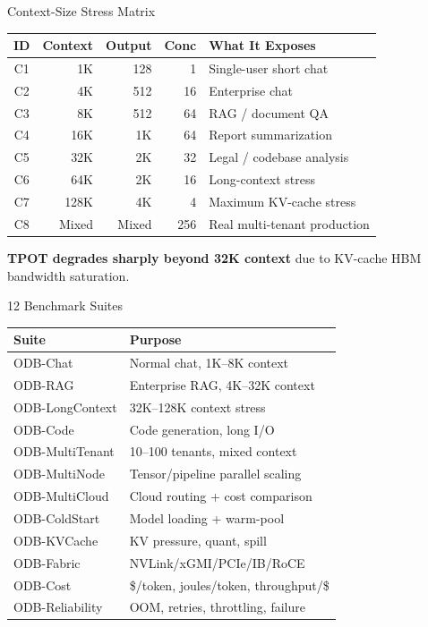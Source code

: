 \documentclass[aspectratio=169,10pt]{beamer}
\begin{document}
\begin{frame}{Context-Size Stress Matrix}
\centering
\small
\begin{tabular}{@{}crrrl@{}}
\toprule
\textbf{ID} & \textbf{Context} & \textbf{Output} & \textbf{Conc} & \textbf{What It Exposes} \\
\midrule
C1 & 1K & 128 & 1 & Single-user short chat \\
C2 & 4K & 512 & 16 & Enterprise chat \\
C3 & 8K & 512 & 64 & RAG / document QA \\
C4 & 16K & 1K & 64 & Report summarization \\
C5 & 32K & 2K & 32 & Legal / codebase analysis \\
C6 & 64K & 2K & 16 & Long-context stress \\
C7 & 128K & 4K & 4 & Maximum KV-cache stress \\
C8 & Mixed & Mixed & 256 & Real multi-tenant production \\
\bottomrule
\end{tabular}
\vspace{0.5em}

\textcolor{t4}{\textbf{TPOT degrades sharply beyond 32K context}} due to KV-cache HBM bandwidth saturation.
\end{frame}

\begin{frame}{12 Benchmark Suites}
\centering
\small
\begin{tabular}{@{}ll@{}}
\toprule
\textbf{Suite} & \textbf{Purpose} \\
\midrule
ODB-Chat & Normal chat, 1K--8K context \\
ODB-RAG & Enterprise RAG, 4K--32K context \\
ODB-LongContext & 32K--128K context stress \\
ODB-Code & Code generation, long I/O \\
ODB-MultiTenant & 10--100 tenants, mixed context \\
ODB-MultiNode & Tensor/pipeline parallel scaling \\
ODB-MultiCloud & Cloud routing + cost comparison \\
ODB-ColdStart & Model loading + warm-pool \\
ODB-KVCache & KV pressure, quant, spill \\
ODB-Fabric & NVLink/xGMI/PCIe/IB/RoCE \\
ODB-Cost & \$/token, joules/token, throughput/\$ \\
ODB-Reliability & OOM, retries, throttling, failure \\
\bottomrule
\end{tabular}
\end{frame}
\end{document}
